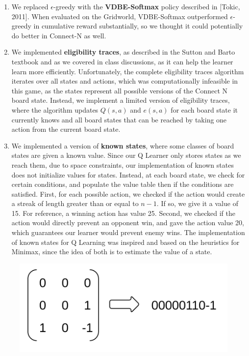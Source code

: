 \documentclass[12pt]{article}
\begin{document}
\begin{enumerate}
\item We replaced $\epsilon$-greedy with the \textbf{VDBE-Softmax} policy described in [Tokic, 2011]. When evaluated on the Gridworld, VDBE-Softmax outperformed $\epsilon$-greedy in cumulative reward substantially, so we thought it could potentially do better in Connect-N as well.
\item We implemented \textbf{eligibility traces}, as described in the Sutton and Barto textbook and as we covered in class discussions, as it can help the learner learn more efficiently. Unfortunately, the complete eligibility traces algorithm iterates over all states and actions, which was computationally infeasible in this game, as the states represent all possible versions of the Connect N board state. Instead, we implement a limited version of eligibility traces, where the algorithm updates $Q(s, a)$ and $e(s, a)$ for each board state it currently knows and all board states that can be reached by taking one action from the current board state.
\item We implemented a version of \textbf{known states}, where some classes of board states are given a known value. Since our Q Learner only stores states as we reach them, due to space constraints, our implementation of known states does not initialize values for states. Instead, at each board state, we check for certain conditions, and populate the value table then if the conditions are satisfied. First, for each possible action, we checked if the action would create a streak of length greater than or equal to $n-1$. If so, we give it a value of 15. For reference, a winning action has value 25. Second, we checked if the action would directly prevent an opponent win, and gave the action value 20, which guarantees our learner would prevent enemy wins. The implementation of known states for Q Learning was inspired and based on the heuristics for Minimax, since the idea of both is to estimate the value of a state.
\end{enumerate}

\begin{figure}
	\includegraphics[scale=.16]{transform}
\end{figure}
\end{document}
